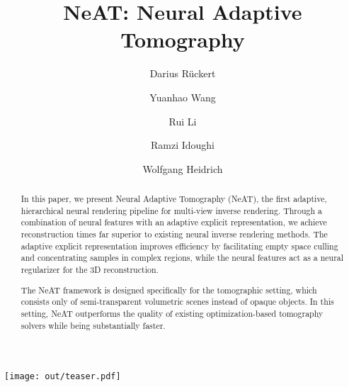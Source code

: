 \documentclass[acmtog,nonacm]{acmart} \acmSubmissionID{0438}
\newcommand{\neat}{NeAT\xspace}
\begin{document}
\title{NeAT: Neural Adaptive Tomography}

\author{Darius R\"uckert}

\author{Yuanhao Wang}
\author{Rui Li}
\author{Ramzi Idoughi}
\author{Wolfgang Heidrich}
\renewcommand\shortauthors{R\"uckert et al.}

\begin{teaserfigure}
	\texttt{[image: out/teaser.pdf]}
	\caption{Neural Adaptive Tomography uses a hybrid
          explicit-implicit neural representation for tomographic
          image reconstruction. Left: The input is a set of X-ray
          images, typically with an ill-posed geometric configuration
          (sparse views or limited angular coverage). Center: \neat
          represents the scene as an octree with neural features in
          each leaf node. This representation lends itself to an
          efficient differentiable rendering algorithm, presented in
          this paper. Right: Through neural rendering \neat can
          reconstruct the 3D geometry even for ill-posed
          configurations, while simultaneously performing geometric
          and radiometric self-calibration.}
	\label{fig:teaser}
\end{teaserfigure}






\begin{abstract}
  In this paper, we present Neural Adaptive Tomography (\neat), the
  first adaptive, hierarchical neural rendering pipeline for
  multi-view inverse rendering. Through a combination of neural
  features with an adaptive explicit representation, we achieve
  reconstruction times far superior to existing neural inverse
  rendering methods. The adaptive explicit representation improves
  efficiency by facilitating empty space culling and concentrating
  samples in complex regions, while the neural features act as a
  neural regularizer for the 3D reconstruction.

  The \neat framework is designed specifically for the tomographic
  setting, which consists only of semi-transparent volumetric scenes
  instead of opaque objects. In this setting, \neat outperforms the
  quality of existing optimization-based tomography solvers while being
  substantially faster.
\end{abstract} 
\end{document}
